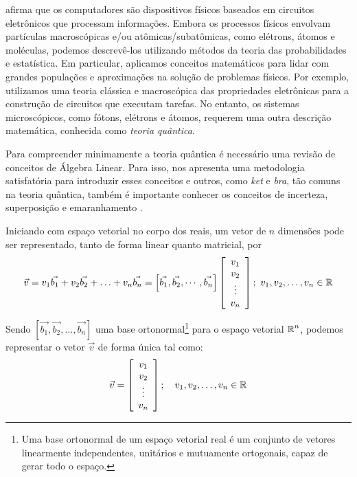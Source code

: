 \textcite{Schuld2021} afirma que os computadores são dispositivos físicos baseados em circuitos eletrônicos que processam informações. Embora os processos físicos envolvam partículas macroscópicas e/ou atômicas/subatômicas, como elétrons, átomos e moléculas, podemos descrevê-los utilizando métodos da teoria das probabilidades e estatística. Em particular, aplicamos conceitos matemáticos para lidar com grandes populações e aproximações na solução de problemas físicos. Por exemplo, utilizamos uma teoria clássica e macroscópica das propriedades eletrônicas para a construção de circuitos que executam tarefas. No entanto, os sistemas microscópicos, como fótons, elétrons e átomos, requerem uma outra descrição matemática, conhecida como \textit{teoria quântica}.

Para compreender minimamente a teoria quântica é necessário uma revisão de conceitos de Álgebra Linear. Para isso, \textcite{Almeida2020} nos apresenta uma metodologia satisfatória para introduzir esses conceitos e outros, como \textit{ket} e \textit{bra}, tão comuns na teoria quântica, também é importante conhecer os conceitos de incerteza, superposição e emaranhamento \cite{hewitt2000fundamentos, mahon2000mecanica}. 

Iniciando com espaço vetorial no corpo dos reais, um vetor de $n$ dimensões pode ser representado, tanto de forma linear quanto matricial, por
$$
    \vec{v} = v_1\vec{b_1}+v_2\vec{b_2}+\ldots+v_n\vec{b_n}=\left[\vec{b_1}, \vec{b_2},\cdots, \vec{b_n}\right]\left[\begin{array}{c}
         v_1\\
         v_2\\ 
         \vdots\\
         v_n
    \end{array}\right];\ v_1, v_2,\ldots, v_n \in \operatorname{\mathbb{R}}
$$

Sendo $\left[\vec{b_1}, \vec{b_2},\dots, \vec{b_n}\right]$ uma base ortonormal\footnote{Uma base ortonormal de um espaço vetorial real é um conjunto de vetores linearmente independentes, unitários e mutuamente ortogonais, capaz de gerar todo o espaço.} para o espaço vetorial $\operatorname{\mathbb{R}}^n$, podemos representar o vetor $\vec{v}$ de forma única tal como:
\begin{equation}
    \label{eq:vetor_v_em_R}
    \vec{v}=\left[\begin{array}{c}
         v_1\\
         v_2\\ 
         \vdots\\
         v_n
    \end{array}\right];\quad v_1, v_2,\ldots, v_n \in \operatorname{\mathbb{R}}
\end{equation} 

